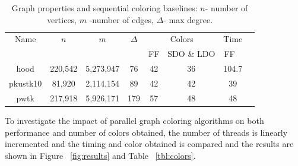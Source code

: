 \documentclass[preprint]{sigplanconf}
\begin{document}
%


\begin{table}[!ht]
\scriptsize
\begin{tabular}{c c c c c c c c }
\hline
Name  &  $n$ & $m$ &  $\Delta$ & \multicolumn{2}{c}{Colors}  & Time  \\ \cline{5-6}
 &  &  &  & FF & SDO $\&$ LDO &  FF  \
\\
\hline
hood & 220,542 & 5,273,947 & 76 & 42 & 36 & 104.7\\
pkustk10 & 81,920 & 2,114,154 & 89 & 42 & 42 & 39\\
pwtk & 217,918 & 5,926,171 & 179 & 57 & 48 & 48\\
\end{tabular}
\caption{Graph properties and sequential coloring baselines: $n$- number of vertices, $m$ -number of edges, $\Delta$- max degree.}
\label{tbl:properties}
\end{table}

To investigate the impact of parallel graph coloring algorithms on  both performance and number of colors obtained, the number of threads is linearly incremented and the timing and color obtained is compared and the results are shown in Figure ~\ref{fig:results} and Table ~\ref{tbl:colors}.
\end{document}
